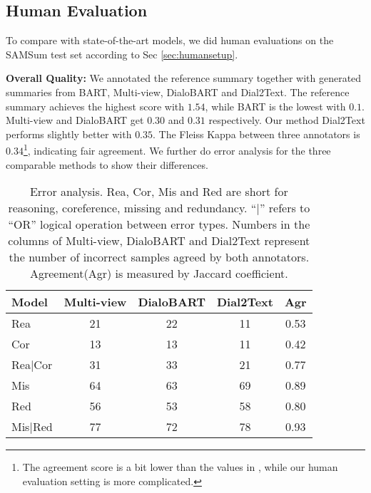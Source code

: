 \subsection{Human Evaluation}\label{sec:humaneval}




To compare with state-of-the-art models, we did human evaluations on the SAMSum test set according to Sec \ref{sec:humansetup}. 

\textbf{Overall Quality:} 
We annotated the reference summary together with generated summaries from BART, Multi-view, DialoBART and Dial2Text.
The reference summary achieves the highest score with $1.54$, while BART is the lowest with $0.1$. Multi-view and DialoBART get $0.30$ and $0.31$ respectively. Our method Dial2Text performs slightly better with $0.35$.
The Fleiss Kappa between three annotators is $0.34$\footnote{The agreement score is a bit lower than the values in \citet{feng2021language}, while our human evaluation setting is more complicated.}, indicating fair agreement. We further do error analysis for the three comparable methods to show their differences.
\begin{table}
	\centering
	\small
	\begin{tabular}{lcccc}
		\toprule[1pt]
		\textbf{Model} & \textbf{Multi-view} & \textbf{DialoBART} & \textbf{Dial2Text} & \textbf{Agr} \\
		\midrule[1pt]
		Rea & 21 & 22 & 11 & 0.53\\
		Cor & 13 & 13 & 11 & 0.42\\
		Rea$\mid$Cor & 31 & 33 & 21 & 0.77\\
		\midrule[1pt]
		Mis & 64 & 63 & 69 & 0.89\\
		Red& 56 & 53 & 58 & 0.80\\
		Mis$\mid$Red & 77 & 72 & 78 & 0.93\\
		\bottomrule[1pt]
	\end{tabular}
	\caption{Error analysis. Rea, Cor, Mis and Red are short for reasoning, coreference, missing and redundancy. ``$\mid$'' refers to ``OR'' logical 
operation between error types. Numbers in the columns of Multi-view, 
DialoBART and Dial2Text represent the number of incorrect samples agreed 
by both annotators. Agreement(Agr) is measured by Jaccard coefficient.}
	\label{tab:error}
\end{table}



